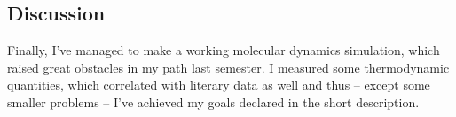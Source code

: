 \begin{multicols}{2}
\section{Discussion}
Finally, I've managed to make a working molecular dynamics simulation, which raised great obstacles in my path last semester. I measured some thermodynamic quantities, which correlated with literary data as well and thus -- except some smaller problems -- I've achieved my goals declared in the short description.

\end{multicols}
